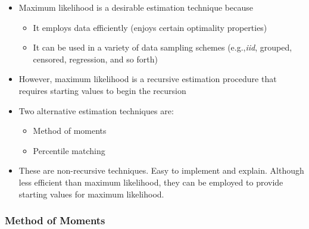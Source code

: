 \documentclass[]{book}
\begin{document}
\begin{itemize}
\item
  Maximum likelihood is a desirable estimation technique because

  \begin{itemize}
  \item
    It employs data efficiently (enjoys certain optimality properties)
  \item
    It can be used in a variety of data sampling schemes
    (e.g.,\emph{iid}, grouped, censored, regression, and so forth)
  \end{itemize}
\item
  However, maximum likelihood is a recursive estimation procedure that
  requires starting values to begin the recursion
\item
  Two alternative estimation techniques are:

  \begin{itemize}
  \item
    Method of moments
  \item
    Percentile matching
  \end{itemize}
\item
  These are non-recursive techniques. Easy to implement and explain.
  Although less efficient than maximum likelihood, they can be employed
  to provide starting values for maximum likelihood.
\end{itemize}

\subsubsection{Method of Moments}\label{method-of-moments}
\end{document}
